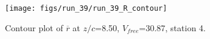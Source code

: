 \begin{figure}[H]
\centering
\texttt{[image: figs/run\_39/run\_39\_R\_contour]}
\caption{Contour plot of $\overline{r}$ at $z/c$=8.50, $V_{free}$=30.87, station 4.}
\label{fig:run_39_R_contour}
\end{figure}


